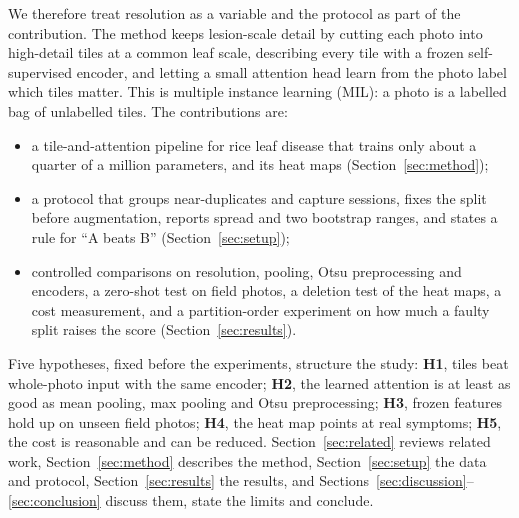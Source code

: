 We therefore treat resolution as a variable and the protocol as part of the contribution. The method keeps lesion-scale
detail by cutting each photo into high-detail tiles at a common leaf scale, describing every tile with a frozen
self-supervised encoder, and letting a small attention head learn from the photo label which tiles matter. This is
multiple instance learning (MIL): a photo is a labelled bag of unlabelled tiles. The contributions are:
\begin{itemize}
\item a tile-and-attention pipeline for rice leaf disease that trains only about a quarter of a million parameters,
and its heat maps (Section~\ref{sec:method});
\item a protocol that groups near-duplicates and capture sessions, fixes the split before augmentation, reports
spread and two bootstrap ranges, and states a rule for ``A beats B'' (Section~\ref{sec:setup});
\item controlled comparisons on resolution, pooling, Otsu preprocessing and encoders, a zero-shot test on field photos,
a deletion test of the heat maps, a cost measurement, and a partition-order experiment on how much a faulty split
raises the score (Section~\ref{sec:results}).
\end{itemize}
Five hypotheses, fixed before the experiments, structure the study:
\textbf{H1}, tiles beat whole-photo input with the same encoder;
\textbf{H2}, the learned attention is at least as good as mean pooling, max pooling and Otsu preprocessing;
\textbf{H3}, frozen features hold up on unseen field photos;
\textbf{H4}, the heat map points at real symptoms;
\textbf{H5}, the cost is reasonable and can be reduced.
Section~\ref{sec:related} reviews related work, Section~\ref{sec:method} describes the method,
Section~\ref{sec:setup} the data and protocol, Section~\ref{sec:results} the results, and
Sections~\ref{sec:discussion}--\ref{sec:conclusion} discuss them, state the limits and conclude.
